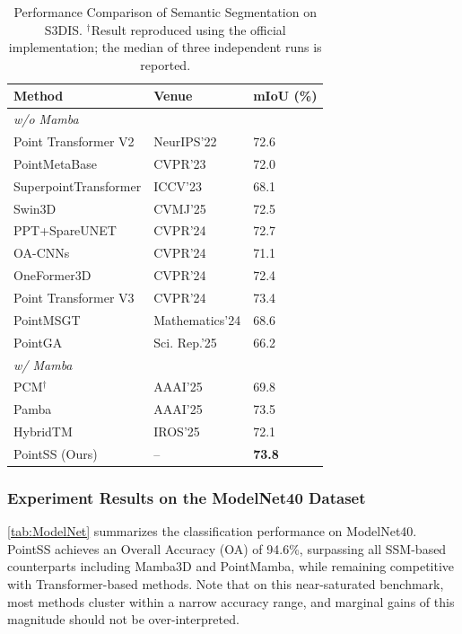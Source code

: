 \documentclass[a4paper,fleqn]{cas-dc}
\begin{document}
\begin{table}[!t]
\centering
\caption{Performance Comparison of Semantic Segmentation on S3DIS. $^\dagger$Result reproduced using the official implementation; the median of three independent runs is reported.}
\label{tab:s3dis}
\begin{tabular}{@{}lll@{}}
\toprule
\textbf{Method} & \textbf{Venue} & \textbf{mIoU (\%)} \\ \midrule
\multicolumn{3}{l}{\textit{w/o Mamba}} \\
Point Transformer V2\cite{ptv2} & NeurIPS'22 & 72.6 \\
PointMetaBase\cite{pmb} & CVPR'23 & 72.0 \\
SuperpointTransformer\cite{spt} & ICCV'23 & 68.1 \\
Swin3D\cite{Swin3D} & CVMJ'25 & 72.5 \\
PPT+SpareUNET\cite{ppt} & CVPR'24 & 72.7 \\
OA-CNNs\cite{oacnn} & CVPR'24 & 71.1 \\
OneFormer3D\cite{OneFormer3D} & CVPR'24 & 72.4 \\
Point Transformer V3\cite{ptv3} & CVPR'24 & 73.4 \\
PointMSGT\cite{pointmsgt} & Mathematics'24 & 68.6 \\
PointGA\cite{pointga} & Sci. Rep.'25 & 66.2 \\ \midrule
\multicolumn{3}{l}{\textit{w/ Mamba}} \\
PCM$^\dagger$\cite{pcm} & AAAI'25 & 69.8 \\
Pamba\cite{pamba} & AAAI'25 & 73.5 \\
HybridTM\cite{hybridtm} & IROS'25 & 72.1 \\
PointSS (Ours) & -- & \textbf{73.8} \\ \bottomrule
\end{tabular}
\end{table}

\subsubsection{Experiment Results on the ModelNet40 Dataset}

\cref{tab:ModelNet} summarizes the classification performance on ModelNet40. PointSS achieves an Overall Accuracy (OA) of 94.6\%, surpassing all SSM-based counterparts including Mamba3D and PointMamba, while remaining competitive with Transformer-based methods. Note that on this near-saturated benchmark, most methods cluster within a narrow accuracy range, and marginal gains of this magnitude should not be over-interpreted.
\end{document}
